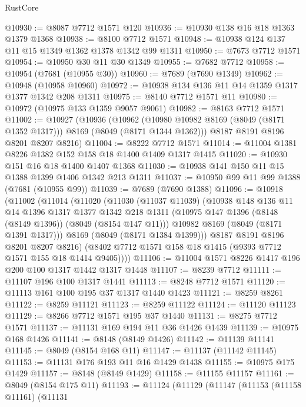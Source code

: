 \begin{lexlean}{RustCore}
\begin{coremodule}
@10930 := @8087 @7712 @1571 @120
@10936 := @10930 @138 @16 @18 @1363 @1379 @1368
@10938 := @8100 @7712 @1571
@10948 := @10938 @124 @137 @11 @15 @1349 @1362 @1378 @1342 @99 @1311
@10950 := @7673 @7712 @1571
@10954 := @10950 @30 @11 @30 @1349
@10955 := @7682 @7712
@10958 := @10954 (@7681 (@10955 @30))
@10960 := @7689 (@7690 @1349)
@10962 := @10948 (@10958 @10960)
@10972 := @10938 @134 @136 @11 @14 @1359 @1317 @1377 @1342 @208 @1311
@10975 := @8140 @7712 @1571 @11
@10980 := @10972 (@10975 @133 @1359 @9057 @9061)
@10982 := @8163 @7712 @1571
@11002 := @10927
    (@10936
      (@10962 (@10980 @10982 @8169 (@8049 (@8171 @1352 @1317))) @8169 (@8049 (@8171 @1344 @1362)))
      @8187
      @8191
      @8196
      @8201
      @8207
      @8216)
@11004 := @8222 @7712 @1571
@11014 := @11004 @1381 @8226 @1382 @152 @158 @18 @1400 @1409 @1317 @1415
@11020 := @10930 @151 @16 @18 @1400 @1407 @1368
@11030 := @10938 @141 @150 @11 @15 @1388 @1399 @1406 @1342 @213 @1311
@11037 := @10950 @99 @11 @99 @1388 (@7681 (@10955 @99))
@11039 := @7689 (@7690 @1388)
@11096 := @10918
    (@11002
      (@11014
        (@11020
          (@11030
            (@11037 @11039)
            (@10938
              @148
              @136
              @11
              @14
              @1396
              @1317
              @1377
              @1342
              @218
              @1311
              (@10975 @147 @1396 (@8148 (@8149 @1396)) (@8049 (@8154 @147 @11)))
              @10982
              @8169
              (@8049 (@8171 @1391 @1317)))
            @8169
            (@8049 (@8171 @1384 @1399)))
          @8187
          @8191
          @8196
          @8201
          @8207
          @8216)
        (@8402 @7712 @1571 @158 @18 @1415 (@9393 @7712 @1571 @155 @18 @1414 @9405))))
@11106 := @11004 @1571 @8226 @1417 @196 @200 @100 @1317 @1442 @1317 @1448
@11107 := @8239 @7712
@11111 := @11107 @196 @100 @1317 @1441
@11113 := @8248 @7712 @1571
@11120 := @11113 @161 @100 @195 @37 @1317 @1440 @1423
@11121 := @8259 @8261
@11122 := @8259 @11121
@11123 := @8259 @11122
@11124 := @11120 @11123
@11129 := @8266 @7712 @1571 @195 @37 @1440
@11131 := @8275 @7712 @1571
@11137 := @11131 @169 @194 @11 @36 @1426 @1439
@11139 := @10975 @168 @1426
@11141 := @8148 (@8149 @1426)
@11142 := @11139 @11141
@11145 := @8049 (@8154 @168 @11)
@11147 := @11137 (@11142 @11145)
@11153 := @11131 @176 @193 @11 @16 @1429 @1438
@11155 := @10975 @175 @1429
@11157 := @8148 (@8149 @1429)
@11158 := @11155 @11157
@11161 := @8049 (@8154 @175 @11)
@11193 := @11124
    (@11129
      (@11147
        (@11153
          (@11158 @11161)
          (@11131

\end{coremodule}
\end{lexlean}
